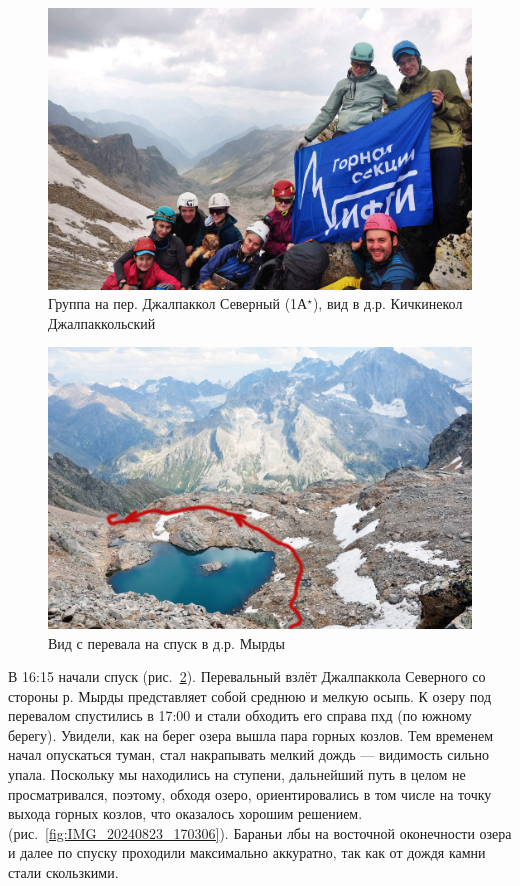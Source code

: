 \begin{figure}[h!]	
	\centering
	\includegraphics[angle=0, width=0.7\linewidth]{../pics/DSC_0069}
	\caption{Группа на пер. Джалпаккол Северный (1А$^\star$), вид в д.р. Кичкинекол Джалпаккольский}
	\label{fig:DSC_0069}
\end{figure}

\begin{figure}[h!]	
	\centering
	\includegraphics[angle=0, width=0.7\linewidth]{../pics/DSC_0041}
	\caption{Вид с перевала на спуск в д.р. Мырды}
	\label{fig:DSC_0041}
\end{figure}

В 16:15 начали спуск (рис.~\ref{fig:DSC_0041}). Перевальный взлёт Джалпаккола Северного со стороны р. Мырды представляет собой среднюю и мелкую осыпь. К озеру под перевалом спустились в 17:00 и стали обходить его справа пхд (по южному берегу). Увидели, как на берег озера вышла пара горных козлов. Тем временем начал опускаться туман, стал накрапывать мелкий дождь --- видимость сильно упала. Поскольку мы находились на ступени, дальнейший путь в целом не просматривался, поэтому, обходя озеро, ориентировались в том числе на точку выхода горных козлов, что оказалось хорошим решением. (рис.~\ref{fig:IMG_20240823_170306}). Бараньи лбы на восточной оконечности озера и далее по спуску проходили максимально аккуратно, так как от дождя камни стали скользкими. 
 
